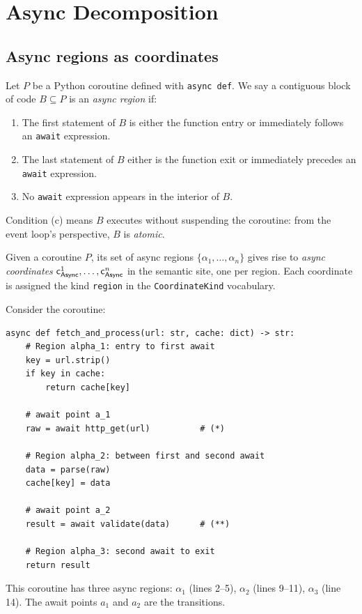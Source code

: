 \documentclass[11pt]{article}
\newcommand{\Async}{\mathsf{Async}}          %
\newcommand{\asyncCoord}[1]{\coord_{\Async}^{#1}} %
\newcommand{\asyncRegion}[1]{\alpha_{#1}}    %
\begin{document}
\section{Async Decomposition}\label{sec:async-decomp}

\subsection{Async regions as coordinates}

Let $P$ be a Python coroutine defined with \texttt{async def}.  We say a
contiguous block of code $B \subseteq P$ is an \emph{async region} if:
\begin{enumerate}[label=(\alph*)]
  \item The first statement of $B$ is either the function entry or
        immediately follows an \texttt{await} expression.
  \item The last statement of $B$ either is the function exit or immediately
        precedes an \texttt{await} expression.
  \item No \texttt{await} expression appears in the interior of $B$.
\end{enumerate}
Condition (c) means $B$ executes without suspending the coroutine: from the
event loop's perspective, $B$ is \emph{atomic}.

\begin{definition}\label{def:async-coord}
Given a coroutine $P$, its set of async regions $\{\asyncRegion{1}, \dots,
\asyncRegion{n}\}$ gives rise to \emph{async coordinates}
$\asyncCoord{1}, \dots, \asyncCoord{n}$ in the semantic site, one per region.
Each coordinate is assigned the kind \texttt{region} in the
\texttt{CoordinateKind} vocabulary.
\end{definition}

\begin{example}\label{ex:simple-async}
Consider the coroutine:
\begin{lstlisting}[style=jugeo-python]
async def fetch_and_process(url: str, cache: dict) -> str:
    # Region alpha_1: entry to first await
    key = url.strip()
    if key in cache:
        return cache[key]

    # await point a_1
    raw = await http_get(url)          # (*)

    # Region alpha_2: between first and second await
    data = parse(raw)
    cache[key] = data

    # await point a_2
    result = await validate(data)      # (**)

    # Region alpha_3: second await to exit
    return result
\end{lstlisting}
This coroutine has three async regions:
$\asyncRegion{1}$ (lines 2--5),
$\asyncRegion{2}$ (lines 9--11),
$\asyncRegion{3}$ (line 14).
The await points $a_1$ and $a_2$ are the transitions.
\end{example}
\end{document}
